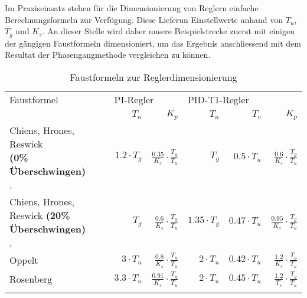 Im  Praxiseinsatz  stehen  f\"ur  die  Dimensionierung  von  Reglern  einfache
Berechnungsformeln  zur Verf\"ugung. Diese  Lieferun Einstellwerte  anhand von
$T_u$, $T_g$  und $K_s$. An  dieser Stelle  wird daher  unsere Beispielstrecke
zuerst mit einigen der g\"angigen  Faustformeln dimensioniert, um das Ergebnis
anschliessend mit dem Resultat der Phasengangmethode vergleichen zu k\"onnen.

\begin{longtable}{p{50mm}rrrrr}
    \toprule


    Faustformel
    &
    \multicolumn{2}{l}{PI-Regler}
    &
    \multicolumn{2}{l}{PID-T1-Regler}
    \\

    &
    $T_n$
    &
    $K_p$
    &
    $T_n$
    &
    $T_v$
    &
    $K_p$
    \\

    \midrule

    \endhead
    \endfoot
    \endlastfoot


    \pbox{45mm}{Chiens, Hrones, Reswick \\ \small{\textbf{(0\% \"Uberschwingen)}} \\ \cite{ref:chiens_tsn}, \cite{ref:chiens_wiki}}
    &
    $1.2\cdot T_g$
    &
    $\frac{0.35}{K_s} \cdot \frac{T_g}{T_u}$
    &
    $T_g$
    &
    $0.5\cdot T_u$
    &
    $ \frac{0.6}{K_s} \cdot \frac{T_g}{T_u} $
    \\

    \addlinespace[1em]

    \pbox{45mm}{Chiens, Hrones, Reswick \small{\textbf{(20\% \"Uberschwingen)}} \\ \cite{ref:chiens_tsn}, \cite{ref:chiens_wiki}}
    &
    $T_g$
    &
    $\frac{0.6}{K_s} \cdot \frac{T_g}{T_u}$
    &
    $1.35\cdot T_g$
    &
    $0.47 \cdot T_u$
    &
    $ \frac{0.95}{K_s} \cdot \frac{T_g}{T_u} $
    \\

    \addlinespace[1em]

    Oppelt \cite{ref:op_ros_zieg}
    &
    $3 \cdot T_u$
    &
    $\frac{0.8}{K_s} \cdot \frac{T_g}{T_u}$
    &
    $2 \cdot T_u$
    &
    $ 0.42 \cdot T_u $
    &
    $ \frac{1.2}{K_s} \cdot \frac{T_g}{T_u} $
    \\

    \addlinespace[1em]

    Rosenberg \cite{ref:op_ros_zieg}
    &
    $3.3 \cdot T_u $
    &
    $ \frac{0.91}{K_s} \cdot \frac{T_g}{T_u} $
    &
    $ 2 \cdot T_u $
    &
    $ 0.45 \cdot T_u $
    &
    $ \frac{1.2}{T_s} \cdot \frac{T_g}{T_u}$
    \\

    \addlinespace[1em]

    \bottomrule
\caption{Faustformeln zur Reglerdimensionierung}
\label{tab:faustformeln}
\end{longtable}

